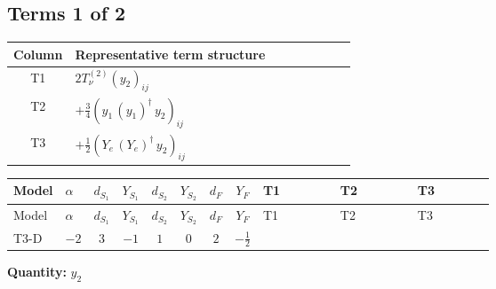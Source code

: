 \documentclass[8pt]{article}
\begin{document}
\begin{landscape}
\subsection*{Terms 1 of 2}
\begin{center}
\begin{tabular}{@{}c >{\raggedright\arraybackslash}p{0.82\linewidth}@{}}
\toprule
Column & Representative term structure \\
\midrule
T1 & \(\displaystyle 2 T_{\nu}^{(2)} \left({y_2}\right)_{ij}\) \\
\midrule
T2 & \(\displaystyle +\frac{3}{4} \left({y_1}\,\left({y_1}\right)^{\dagger}\,{y_2}\right)_{ij}\) \\
\midrule
T3 & \(\displaystyle +\frac{1}{2} \left({Y_e}\,\left({Y_e}\right)^{\dagger}\,{y_2}\right)_{ij}\) \\
\midrule
\bottomrule
\end{tabular}
\end{center}
\smallskip
\tiny
\begin{longtable}{@{}llcccccc >{\raggedright\arraybackslash}p{0.21\linewidth} >{\raggedright\arraybackslash}p{0.21\linewidth} >{\raggedright\arraybackslash}p{0.21\linewidth}@{}}
\toprule
Model & $\alpha$ & $d_{S_1}$ & $Y_{S_1}$ & $d_{S_2}$ & $Y_{S_2}$ & $d_F$ & $Y_F$ & T1 & T2 & T3 \\
\midrule
\endfirsthead
\toprule
Model & $\alpha$ & $d_{S_1}$ & $Y_{S_1}$ & $d_{S_2}$ & $Y_{S_2}$ & $d_F$ & $Y_F$ & T1 & T2 & T3 \\
\midrule
\endhead
T3-D & $-2$ & $3$ & $-1$ & $1$ & $0$ & $2$ & $-\frac{1}{2}$ & \scriptsize\adjustbox{max width=\linewidth}{$\begin{gathered} 2 T_{\nu}^{(2)} \left({y_2}\right)_{ij}\end{gathered}$} & \scriptsize\adjustbox{max width=\linewidth}{$\begin{gathered} +\frac{3}{4} \left({y_1}\,\left({y_1}\right)^{\dagger}\,{y_2}\right)_{ij}\end{gathered}$} & \scriptsize\adjustbox{max width=\linewidth}{$\begin{gathered} +\frac{1}{2} \left({Y_e}\,\left({Y_e}\right)^{\dagger}\,{y_2}\right)_{ij}\end{gathered}$} \\
\midrule
\bottomrule
\end{longtable}
\clearpage
\noindent\textbf{Quantity: }$y_2$\par\smallskip

\end{landscape}
\end{document}

